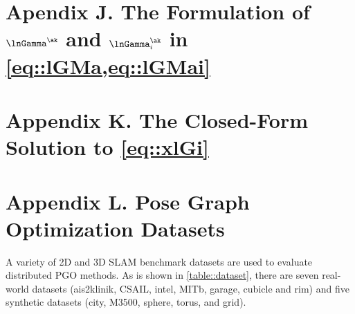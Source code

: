 \section*{Apendix J.\;\; The Formulation of $\lnGamma^{\ak}$ and $\lnGamma_i^{\ak}$ in \cref{eq::lGMa,eq::lGMai}}\label{appendix::J}


\section*{Appendix K.\;\; The Closed-Form Solution to \cref{eq::xlGi}}\label{appendix::K}



\section*{Appendix L.\;\; Pose Graph Optimization  Datasets}\label{appendix::L}
A variety of 2D and 3D SLAM benchmark datasets \cite{rosen2016se} are used to evaluate distributed PGO methods. As is shown in \cref{table::dataset}, there are seven real-world datasets ({\sf ais2klinik}, 	{\sf CSAIL}, {\sf intel}, {\sf MITb}, {\sf garage}, {\sf cubicle} and {\sf rim}) and five synthetic datasets ({\sf city}, {\sf M3500}, {\sf sphere}, {\sf torus}, and {\sf grid}).

